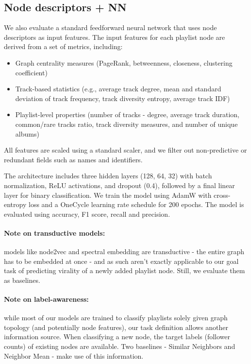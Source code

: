 \documentclass[9pt,twocolumn,twoside]{pnas-report}
\begin{document}
\subsection{Node descriptors + NN}
We also evaluate a standard feedforward neural network that uses node descriptors as input features. The input features for each playlist node are derived from a set of metrics, including:
\begin{itemize}
    \item Graph centrality measures (PageRank, betweenness, closeness, clustering coefficient)
    \item Track-based statistics (e.g., average track degree, mean and standard deviation of track frequency, track diversity entropy, average track IDF)
    \item Playlist-level properties (number of tracks - degree, average track duration, common/rare tracks ratio, track diversity measures, and number of unique albums)
\end{itemize}
All features are scaled using a standard scaler, and we filter out non-predictive or redundant fields such as names and identifiers.

The architecture includes three hidden layers (128, 64, 32) with batch normalization, ReLU activations, and dropout (0.4), followed by a final linear layer for binary classification. We train the model using AdamW with cross-entropy loss and a OneCycle learning rate schedule for 200 epochs. The model is evaluated using accuracy, F1 score, recall and precision. 



\paragraph{Note on transductive models:} models like node2vec and spectral embedding are transductive - the entire graph has to be embedded at once - and as such aren’t exactly applicable to our goal task of predicting virality of a newly added playlist node. Still, we evaluate them as baselines.

\paragraph{Note on label-awareness:} while most of our models are trained to classify playlists solely given graph topology (and potentially node features), our task definition allows another information source. When classifying a new node, the target labels (follower counts) of existing nodes are available. Two baselines - Similar Neighbors and Neighbor Mean - make use of this information.
\end{document}
